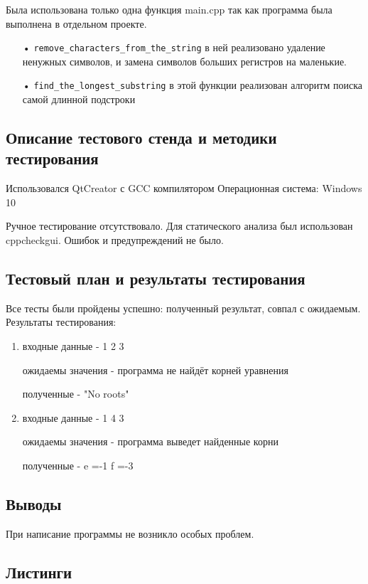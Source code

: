 \documentclass[12pt,a4paper]{report}
\begin{document}
Была использована только одна функция main.cpp так как программа была выполнена в отдельном проекте.


\begin{enumerate}
\item[•] \verb-remove_characters_from_the_string- в ней реализовано удаление ненужных символов, и замена символов больших регистров на маленькие.
\item[•] \verb-find_the_longest_substring- в этой функции реализован алгоритм поиска самой длинной подстроки
\end{enumerate}

\subsection{Описание тестового стенда и методики тестирования}
Использовался QtCreator с GCC компилятором
Операционная система: Windows 10


Ручное тестирование отсутствовало.
Для статического анализа был использован cppcheckgui. Ошибок и предупреждений не было.

\subsection{Тестовый план и результаты тестирования}
Все тесты были пройдены успешно: полученный результат, совпал с ожидаемым. Результаты тестирования:
\begin{enumerate}
\item входные данные - 1 2 3

ожидаемы значения - программа не найдёт корней уравнения

полученные - "No roots"

\item входные данные - 1 4 3

ожидаемы значения - программа выведет найденные корни

полученные - e =-1
             f =-3
\end{enumerate}

\subsection{Выводы}

При написание программы не возникло особых проблем.

\subsection*{Листинги}
\end{document}
